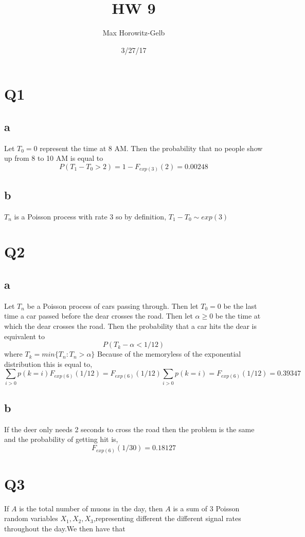 \documentclass{article}
\title{HW 9}
\date{3/27/17}
\author{Max Horowitz-Gelb}
\begin{document}
\maketitle
\section*{Q1}
\subsection*{a}
Let $T_0 = 0$ represent the time at 8 AM. Then the probability that no people show up from 8 to 10 AM is equal to 
$$
P(T_1-T_0 > 2) = 1 - F_{exp(3)}(2) = 0.00248
$$ 

\subsection*{b}
$T_n$ is a Poisson process with rate 3 so by definition, $T_1 - T_0 \sim exp(3)$

\section*{Q2}
\subsection*{a}
Let $T_n$ be a Poisson process of cars passing through. Then let $T_0 = 0$ be the last time a car passed before the dear crosses the road. Then let $\alpha \geq 0$ be the time at which the dear crosses the road.
Then the probability that a car hits the dear is equivalent to 
$$
P(T_{k} - \alpha < 1/12)
$$ where $T_k = min\{T_n : T_n > \alpha\}$
Because of the memoryless of the exponential distribution this is equal to, 
$$
\sum_{i > 0} p(k = i)F_{exp(6)}(1/12) = F_{exp(6)}(1/12) \sum_{i > 0} p(k = i) = F_{exp(6)}(1/12) = 0.39347
$$
\subsection*{b}
If the deer only needs 2 seconds to cross the road then the problem is the same and the probability of getting hit is,
$$
F_{exp(6)}(1/30) = 0.18127
$$

\section*{Q3}
If $A$ is the total number of muons in the day, then $A$ is a sum of 3 Poisson random variables $X_1, X_2, X_3$,representing different the different signal rates throughout the day.We then have that 
\end{document}

